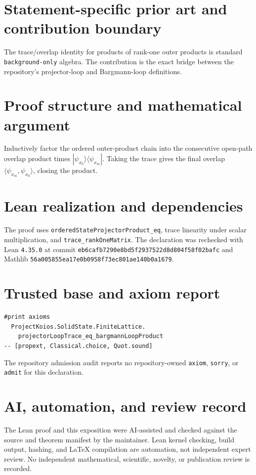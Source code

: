 \documentclass[11pt]{article}
\begin{document}
\section{Statement-specific prior art and contribution boundary}
The trace/overlap identity for products of rank-one outer products is standard \texttt{background-only} algebra.  The contribution is the exact bridge between the repository's projector-loop and Bargmann-loop definitions.

\section{Proof structure and mathematical argument}
Inductively factor the ordered outer-product chain into the consecutive open-path overlap product times $|\psi_{x_0}\rangle\langle\psi_{x_m}|$.  Taking the trace gives the final overlap $\langle\psi_{x_m},\psi_{x_0}\rangle$, closing the product.

\section{Lean realization and dependencies}
The proof uses \texttt{orderedStateProjectorProduct\_eq}, trace linearity under scalar multiplication, and \texttt{trace\_rankOneMatrix}.  The declaration was rechecked with Lean \texttt{4.35.0} at commit \texttt{eb6cafb7290e8bd5f2937522d8d804f58f02bafc} and Mathlib \texttt{56a005855ea17e0b0958f73ec801ae140b0a1679}.

\section{Trusted base and axiom report}
\begin{verbatim}
#print axioms
  ProjectKoios.SolidState.FiniteLattice.
    projectorLoopTrace_eq_bargmannLoopProduct
-- [propext, Classical.choice, Quot.sound]
\end{verbatim}
The repository admission audit reports no repository-owned \texttt{axiom}, \texttt{sorry}, or
\texttt{admit} for this declaration.

\section{AI, automation, and review record}
The Lean proof and this exposition were AI-assisted and checked against the source and theorem
manifest by the maintainer.  Lean kernel checking, build output, hashing, and LaTeX compilation are
automation, not independent expert review.  No independent mathematical, scientific, novelty, or
publication review is recorded.
\end{document}
